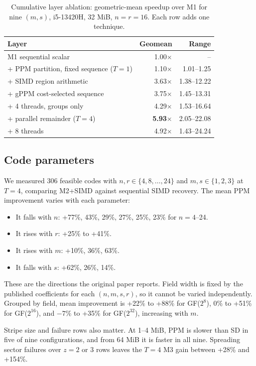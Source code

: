 \documentclass[conference]{IEEEtran}
\begin{document}
\begin{table}[t]
\caption{Cumulative layer ablation: geometric-mean speedup over M1 for nine $(m,s)$, i5-13420H, 32 MiB, $n=r=16$. Each row adds one technique.}
\label{tab:ablation}
\centering
\footnotesize
\setlength{\tabcolsep}{3pt}
\begin{tabular}{l rr}
\hline
Layer & Geomean & Range\\
\hline
M1 sequential scalar & 1.00$\times$ & --\\
+ PPM partition, fixed sequence ($T{=}1$) & 1.10$\times$ & 1.01--1.25\\
+ SIMD region arithmetic & 3.63$\times$ & 1.38--12.22\\
+ gPPM cost-selected sequence & 3.75$\times$ & 1.45--13.31\\
+ 4 threads, groups only & 4.29$\times$ & 1.53--16.64\\
+ parallel remainder ($T{=}4$) & \textbf{5.93$\times$} & 2.05--22.08\\
+ 8 threads & 4.92$\times$ & 1.43--24.24\\
\hline
\end{tabular}
\end{table}

\subsection{Code parameters}
We measured 306 feasible codes with $n,r\in\{4,8,\dots,24\}$ and $m,s\in\{1,2,3\}$ at $T=4$, comparing M2+SIMD against sequential SIMD recovery. The mean PPM improvement varies with each parameter:
\begin{itemize}
\item It falls with $n$: +77\%, 43\%, 29\%, 27\%, 25\%, 23\% for $n=4$--24.
\item It rises with $r$: +25\% to +41\%.
\item It rises with $m$: +10\%, 36\%, 63\%.
\item It falls with $s$: +62\%, 26\%, 14\%.
\end{itemize}
These are the directions the original paper reports. Field width is fixed by the published coefficients for each $(n,m,s,r)$, so it cannot be varied independently. Grouped by field, mean improvement is +22\% to +88\% for GF($2^8$), 0\% to +51\% for GF($2^{16}$), and $-7$\% to +35\% for GF($2^{32}$), increasing with $m$.

Stripe size and failure rows also matter. At 1--4 MiB, PPM is slower than SD in five of nine configurations, and from 64 MiB it is faster in all nine. Spreading sector failures over $z=2$ or 3 rows leaves the $T=4$ M3 gain between +28\% and +154\%.
\end{document}
